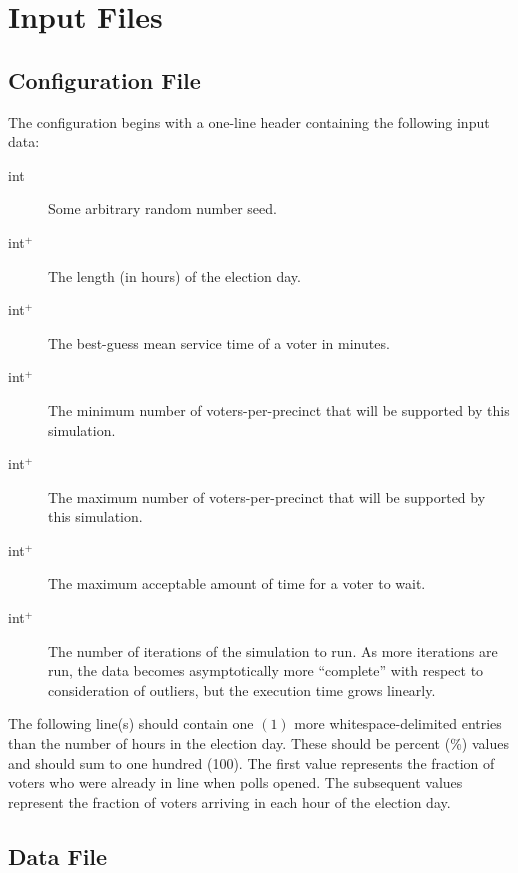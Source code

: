%

\chapter{Input Files} \label{hxtk-input-files}

\section{Configuration File} \label{hxtk-config-file}

The configuration begins with a one-line header containing the following input data:

\begin{description}
\item[int] Some arbitrary random number seed.
\item[int$^+$] The length (in hours) of the election day.
\item[int$^+$] The best-guess mean service time of a voter in minutes.
\item[int$^+$] The minimum number of voters-per-precinct that will be supported by this simulation.
\item[int$^+$] The maximum number of voters-per-precinct that will be supported by this simulation.
\item[int$^+$] The maximum acceptable amount of time for a voter to wait.
\item[int$^+$] The number of iterations of the simulation to run. As more iterations are run, the data becomes asymptotically more ``complete'' with respect to consideration of outliers, but the execution time grows linearly.
\end{description}

The following line(s) should contain one $(1)$ more whitespace-delimited entries than the number of hours in the election day. These should be percent (\%) values and should sum to one hundred (100). The first value represents the fraction of voters who were already in line when polls opened. The subsequent values represent the fraction of voters arriving in each hour of the election day.

\section{Data File} \label{hxtk-data-file}

